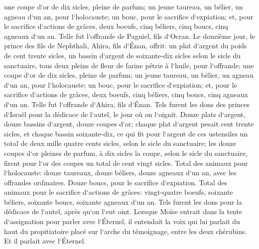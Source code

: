 \verse une coupe d`or de dix sicles, pleine de parfum; 
\verse un jeune taureau, un bélier, un agneau d`un an, pour l`holocauste; 
\verse un bouc, pour le sacrifice d`expiation; 
\verse et, pour le sacrifice d`actions de grâces, deux boeufs, cinq béliers, cinq boucs, cinq agneaux d`un an. Telle fut l`offrande de Paguiel, fils d`Ocran. 
\verse Le douzième jour, le prince des fils de Nephthali, Ahira, fils d`Énan, 
\verse offrit: un plat d`argent du poids de cent trente sicles, un bassin d`argent de soixante-dix sicles selon le sicle du sanctuaire, tous deux pleins de fleur de farine pétrie à l`huile, pour l`offrande; 
\verse une coupe d`or de dix sicles, pleine de parfum; 
\verse un jeune taureau, un bélier, un agneau d`un an, pour l`holocauste; 
\verse un bouc, pour le sacrifice d`expiation; 
\verse et, pour le sacrifice d`actions de grâces, deux boeufs, cinq béliers, cinq boucs, cinq agneaux d`un an. Telle fut l`offrande d`Ahira, fils d`Énan. 
\verse Tels furent les dons des princes d`Israël pour la dédicace de l`autel, le jour où on l`oignit. Douze plats d`argent, douze bassins d`argent, douze coupes d`or; 
\verse chaque plat d`argent pesait cent trente sicles, et chaque bassin soixante-dix, ce qui fit pour l`argent de ces ustensiles un total de deux mille quatre cents sicles, selon le sicle du sanctuaire; 
\verse les douze coupes d`or pleines de parfum, à dix sicles la coupe, selon le sicle du sanctuaire, firent pour l`or des coupes un total de cent vingt sicles. 
\verse Total des animaux pour l`holocauste: douze taureaux, douze béliers, douze agneaux d`un an, avec les offrandes ordinaires. Douze boucs, pour le sacrifice d`expiation. 
\verse Total des animaux pour le sacrifice d`actions de grâces: vingt-quatre boeufs, soixante béliers, soixante boucs, soixante agneaux d`un an. Tels furent les dons pour la dédicace de l`autel, après qu`on l`eut oint. 
\verse Lorsque Moïse entrait dans la tente d`assignation pour parler avec l`Éternel, il entendait la voix qui lui parlait du haut du propitiatoire placé sur l`arche du témoignage, entre les deux chérubins. Et il parlait avec l`Éternel. 

